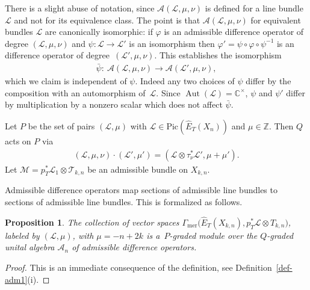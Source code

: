 \documentclass[pdftex]{sigma}
\numberwithin{equation}{section}
\newtheorem{Proposition}[Theorem]{Proposition}
 { \theoremstyle{definition}
\newtheorem{Definition}[Theorem]{Definition}
\newtheorem{Example}[Theorem]{Example}
\newtheorem{Remark}[Theorem]{Remark} }
\begin{document}
\begin{Remark} There is a slight abuse of notation, since $\mathcal A(\mathcal L,\mu,\nu)$ is defined for a line bundle~$\mathcal L$ and not for its equivalence class. The point is that $\mathcal A(\mathcal L,\mu,\nu)$ for equivalent bundles $\mathcal L$ are canonically isomorphic: if $\varphi$ is an admissible difference operator of degree $(\mathcal L,\mu,\nu)$ and $\psi\colon \mathcal L\to \mathcal L'$ is an isomorphism then $\varphi'=\psi\circ\varphi\circ\psi^{-1}$ is an difference operator of degree~$(\mathcal L',\mu,\nu)$. This establishes the isomorphism
 \begin{gather*}
 \bar\psi\colon \ \mathcal A(\mathcal L,\mu,\nu)\to \mathcal A(\mathcal L',\mu,\nu),
 \end{gather*}
 which we claim is independent of $\psi$. Indeed any two choices of $\psi$ differ by the composition with an automorphism of~$\mathcal L$. Since $\operatorname{Aut}(\mathcal L)=\mathbb C^\times$, $\psi$ and $\psi'$ differ by multiplication by a nonzero scalar which does not affect $\bar \psi$.
\end{Remark}
Let $P$ be the set of pairs $(\mathcal L,\mu)$ with $\mathcal L\in\mathrm{Pic}(\hat E_T(X_n))$ and $\mu\in\mathbb Z$. Then $Q$ acts on $P$ via
\begin{gather*}
 (\mathcal L,\mu,\nu)\cdot(\mathcal L',\mu') = (\mathcal L\otimes\tau_\nu^*\mathcal L',\mu+\mu').
\end{gather*}
Let $\mathcal M=p_T^*\mathcal L_1\otimes \mathcal T_{k,n}$ be an admissible bundle on $X_{k,n}$.

Admissible difference operators map sections of admissible line bundles to sections of admissible line bundles. This is formalized as follows.
\begin{Proposition} The collection of vector spaces $\Gamma_{\mathrm{mer}}\big(\hat E_T(X_{k,n}),p_T^*\mathcal L\otimes T_{k,n}\big)$, labeled by $(\mathcal L,\mu)$, with $\mu=-n+2k$ is a~$P$-graded module over the $Q$-graded unital algebra $\mathcal A_n$ of admissible difference operators.
\end{Proposition}
\begin{proof} This is an immediate consequence of the definition, see Definition~\ref{def-adm1}(i).
\end{proof}
\end{document}
